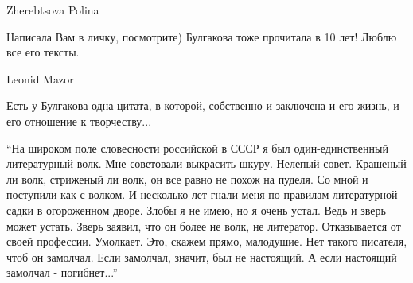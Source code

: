 Zherebtsova Polina

Написала Вам в личку, посмотрите) Булгакова тоже прочитала в 10 лет! Люблю все
его тексты.

Leonid Mazor

Есть у Булгакова одна цитата, в которой, собственно и заключена и его жизнь, и его отношение к творчеству...

\enquote{На широком поле словесности российской в СССР я был один-единственный
литературный волк. Мне советовали выкрасить шкуру. Нелепый совет. Крашеный ли
волк, стриженый ли волк, он все равно не похож на пуделя. Со мной и поступили
как с волком. И несколько лет гнали меня по правилам литературной садки в
огороженном дворе. Злобы я не имею, но я очень устал. Ведь и зверь может
устать. Зверь заявил, что он более не волк, не литератор. Отказывается от своей
профессии. Умолкает. Это, скажем прямо, малодушие. Нет такого писателя, чтоб он
замолчал. Если замолчал, значит, был не настоящий. А если настоящий замолчал -
погибнет...}
